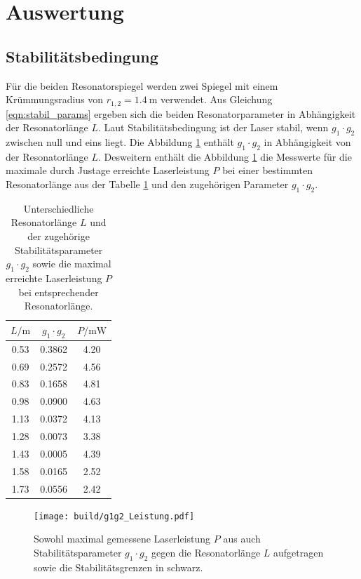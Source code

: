 \section{Auswertung}
\label{sec:Auswertung}



\subsection{Stabilitätsbedingung}
\label{subsec:Stabil}
Für die beiden Resonatorspiegel werden zwei Spiegel mit einem
Krümmungsradius von $r_{1,2}=\SI{1.4}{\meter}$ verwendet.
Aus Gleichung \eqref{eqn:stabil_params} ergeben sich die beiden
Resonatorparameter in Abhängigkeit der Resonatorlänge $L$.
Laut Stabilitätsbedingung ist der Laser stabil,
wenn $g_1\cdot g_2$ zwischen null und eins liegt.
Die Abbildung \ref{fig:oberaffengeilerplot} enthält $g_1 \cdot g_2$
in Abhängigkeit von der Resonatorlänge $L$.
Desweitern enthält die Abbildung \ref{fig:oberaffengeilerplot}
die Messwerte
für die maximale durch Justage
erreichte Laserleistung $P$
bei einer bestimmten Resonatorlänge
aus der Tabelle \ref{tab:stabil}
und den zugehörigen Parameter $g_1 \cdot g_2$.

\begin{table}
  \centering
  \caption{Unterschiedliche Resonatorlänge $L$ und der zugehörige Stabilitätsparameter $g_1 \cdot g_2$
  sowie die maximal erreichte Laserleistung $P$ bei entsprechender Resonatorlänge.}
  \label{tab:stabil}
  \begin{tabular}{ccc}
\toprule
$L/ \si{\meter}$ & $g_1 \cdot g_2$ & $ P/ \si{\milli\watt}$\\
\midrule
0.53	&	0.3862	&	4.20   \\
0.69	&	0.2572	&	4.56   \\
0.83	&	0.1658	&	4.81   \\
0.98	&	0.0900	&	4.63   \\
1.13	&	0.0372	&	4.13   \\
1.28	&	0.0073	&	3.38   \\
1.43	&	0.0005	&	4.39   \\
1.58	&	0.0165	&	2.52   \\
1.73	&	0.0556	&	2.42   \\
\bottomrule
  \end{tabular}
\end{table}


\begin{figure}
  \centering
  \texttt{[image: build/g1g2\_Leistung.pdf]}
  \caption{Sowohl maximal gemessene
  Laserleistung $P$ aus auch
  Stabilitätsparameter $g_1\cdot g_2$ gegen
   die Resonatorlänge $L$ aufgetragen sowie
   die Stabilitätsgrenzen in schwarz.
  }
  \label{fig:oberaffengeilerplot}
\end{figure}



